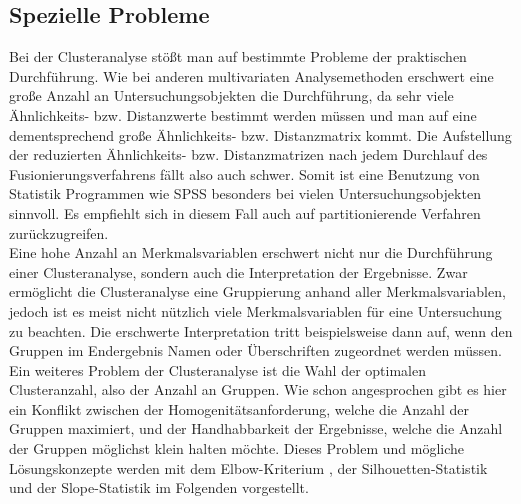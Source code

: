 \documentclass[12pt,titlepage]{article}
\begin{document}
		\subsection{Spezielle Probleme}
			Bei der Clusteranalyse stößt man auf bestimmte Probleme der praktischen Durchführung. Wie bei anderen multivariaten Analysemethoden erschwert eine große Anzahl an Untersuchungsobjekten die Durchführung, da  sehr viele Ähnlichkeits- bzw. Distanzwerte bestimmt werden müssen und man auf eine dementsprechend große Ähnlichkeits- bzw. Distanzmatrix kommt. Die Aufstellung der reduzierten Ähnlichkeits- bzw. Distanzmatrizen nach jedem Durchlauf des Fusionierungsverfahrens fällt also auch schwer. Somit ist eine Benutzung von Statistik Programmen wie SPSS besonders bei vielen Untersuchungsobjekten sinnvoll. Es empfiehlt sich in diesem Fall auch auf partitionierende Verfahren zurückzugreifen. \\
Eine hohe Anzahl an Merkmalsvariablen erschwert nicht nur die Durchführung einer Clusteranalyse, sondern auch die Interpretation der Ergebnisse. Zwar ermöglicht die Clusteranalyse eine Gruppierung anhand aller Merkmalsvariablen, jedoch ist es meist nicht nützlich viele Merkmalsvariablen für eine Untersuchung zu beachten. Die erschwerte Interpretation tritt beispielsweise dann auf, wenn den Gruppen im Endergebnis Namen oder Überschriften zugeordnet werden müssen. \\
Ein weiteres Problem der Clusteranalyse ist die Wahl der optimalen Clusteranzahl, also der Anzahl an Gruppen. Wie schon angesprochen gibt es hier ein Konflikt zwischen der Homogenitätsanforderung, welche die Anzahl der Gruppen maximiert, und der Handhabbarkeit der Ergebnisse, welche die Anzahl der Gruppen möglichst klein halten möchte. Dieses Problem und mögliche Lösungskonzepte werden mit dem Elbow-Kriterium \cite[S. 495 f.]{Backhaus2015}, der Silhouetten-Statistik \cite{ROUSSEEUW198753} und der Slope-Statistik \cite{FUJITA201427} im Folgenden vorgestellt.\\
\end{document}
